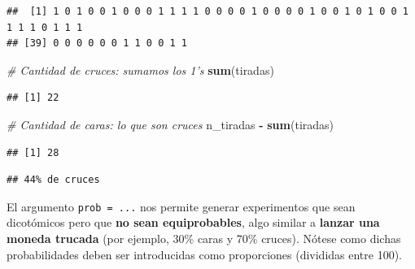 \documentclass[11pt,]{book}
\newenvironment{Shaded}{\begin{snugshade}}{\end{snugshade}}
\newcommand{\CommentTok}[1]{\textcolor[rgb]{0.37,0.37,0.37}{\textit{#1}}}
\newcommand{\DataTypeTok}[1]{\textcolor[rgb]{0.27,0.27,0.27}{#1}}
\newcommand{\DecValTok}[1]{\textcolor[rgb]{0.06,0.06,0.06}{#1}}
\newcommand{\FloatTok}[1]{\textcolor[rgb]{0.06,0.06,0.06}{#1}}
\newcommand{\KeywordTok}[1]{\textcolor[rgb]{0.27,0.27,0.27}{\textbf{#1}}}
\newcommand{\NormalTok}[1]{#1}
\newcommand{\OperatorTok}[1]{\textcolor[rgb]{0.43,0.43,0.43}{\textbf{#1}}}
\newcommand{\OtherTok}[1]{\textcolor[rgb]{0.37,0.37,0.37}{#1}}
\newcommand{\StringTok}[1]{\textcolor[rgb]{0.5,0.5,0.5}{#1}}
\begin{document}
\begin{verbatim}
##  [1] 1 0 1 0 0 1 0 0 0 1 1 1 1 0 0 0 0 1 0 0 0 0 1 0 0 1 0 1 0 0 1 1 1 1 0 1 1 1
## [39] 0 0 0 0 0 0 1 1 0 0 1 1
\end{verbatim}

\begin{Shaded}
\begin{Highlighting}[]
\CommentTok{# Cantidad de cruces: sumamos los 1's}
\KeywordTok{sum}\NormalTok{(tiradas)}
\end{Highlighting}
\end{Shaded}

\begin{verbatim}
## [1] 22
\end{verbatim}

\begin{Shaded}
\begin{Highlighting}[]
\CommentTok{# Cantidad de caras: lo que son cruces}
\NormalTok{n_tiradas }\OperatorTok{-}\StringTok{ }\KeywordTok{sum}\NormalTok{(tiradas)}
\end{Highlighting}
\end{Shaded}

\begin{verbatim}
## [1] 28
\end{verbatim}

\begin{Shaded}
\end{Shaded}

\begin{verbatim}
## 44% de cruces
\end{verbatim}

El argumento \texttt{prob\ =\ ...} nos permite generar experimentos que sean dicotómicos pero que \textbf{no sean equiprobables}, algo similar a \textbf{lanzar una moneda trucada} (por ejemplo, 30\% caras y 70\% cruces). Nótese como dichas probabilidades deben ser introducidas como proporciones (divididas entre 100).

\begin{Shaded}
\end{Shaded}
\end{document}
